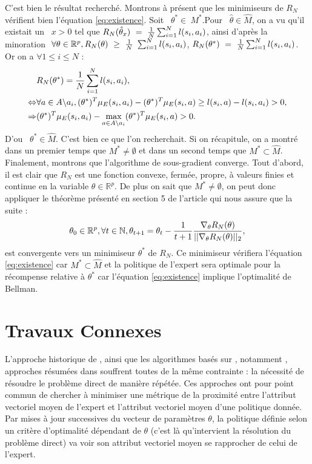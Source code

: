 \documentclass[publibook-draft]{CAp2012}
\begin{document}
C'est bien le résultat recherché. Montrons à présent que les minimiseurs de $R_N$ vérifient bien l'équation \eqref{eq:existence}.
Soit ~$\theta^*\in\ M^*$.Pour ~$\hat{\theta}\in \hat{M}$, on a vu qu'il existait un ~$x>0$ tel que $R_N(\hat{\theta}_x)~=~{1\over N} \sum_{i=1}^N l(s_i,a_i)$, ainsi d'après la minoration $~\forall \theta\in\mathbb{R}^p, R_N(\theta)~\geq~{1\over N}~\sum_{i=1}^Nl(s_i,a_i)$, $R_N(\theta^*)~=~{1\over N} \sum_{i=1}^N l(s_i,a_i)$. Or on a $\forall 1\leq i \leq N$ :
\begin{align}
&R_N(\theta^*)={1\over N} \sum_{i=1}^N l(s_i,a_i),\\
\Leftrightarrow&\forall a \in A \backslash a_i,  (\theta^*)^T\mu_E(s_i,a_i)-(\theta^*)^T\mu_E(s_i,a)\geq l(s_i,a)- l(s_i,a_i)>0,\\
\Rightarrow&(\theta^*)^T\mu_E(s_i,a_i)-\max_{a \in A \backslash a_i}(\theta^*)^T\mu_E(s_i,a)>0.
\end{align}
D'ou ~$\theta^*\in\hat{M}$. C'est bien ce que l'on recherchait. Si on récapitule, on a montré dans un premier temps que $M^*\neq\emptyset$ et dans un second temps que $M^*\subset\hat{M}$.
Finalement, montrons que l'algorithme de sous-gradient converge. Tout d'abord, il est clair que $R_N$ est une fonction convexe, fermée, propre, à valeurs finies et continue en la variable $\theta\in\mathbb{R}^p$. De plus on sait que $M^*\neq\emptyset$, on peut donc appliquer le théorème présenté en section 5 de l'article \cite{correa1993convergence} qui nous assure que la suite :
\begin{equation}
\theta_0\in\mathbb{R}^p, \forall t\in\mathbb{N}, \theta_{t+1}=\theta_t -\frac{1}{t+1}{\nabla_\theta R_N(\theta) \over ||\nabla_\theta R_N(\theta)||_2},
\end{equation}
est convergente vers un minimiseur $\theta^*$ de $R_N$. Ce minimiseur vérifiera l'équation \eqref{eq:existence} car $M^*\subset\hat{M}$ et la politique de l'expert sera optimale pour la récompense relative à $\theta^*$ car l'équation \eqref{eq:existence} implique l'optimalité de Bellman.
\section{Travaux Connexes}
\label{biblio.sec}
L'approche historique de \cite{ng2000algorithms}, ainsi que les algorithmes basés sur \cite{abbeel2004apprenticeship}, notamment \citep{syed2008apprenticeship,syed2008game, ziebart2008maximum}, approches résumées dans \cite{neu2009training} souffrent toutes de la même contrainte : la nécessité de résoudre le problème direct de manière répétée. Ces approches ont pour point commun de chercher à minimiser une métrique de la proximité entre l'attribut vectoriel moyen de l'expert et l'attribut vectoriel moyen d'une politique donnée. Par mises à jour successives du vecteur de paramètres $\theta$, la politique définie selon un critère d'optimalité dépendant de $\theta$ (c'est là qu'intervient la résolution du problème direct) va voir son attribut vectoriel moyen se rapprocher de celui de l'expert.\\
\end{document}
